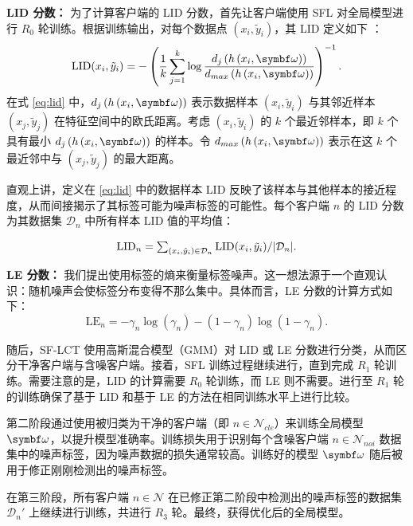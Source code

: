 \textbf{LID 分数：} 为了计算客户端的 LID 分数，首先让客户端使用 SFL 对全局模型进行 $R_0$ 轮训练。根据训练输出，对每个数据点 $(x_i,\tilde{y}_i)$，其 LID 定义如下 \cite{b9,amsaleg2015estimating,houle2013dimensionality}：
\begin{align}\label{eq:lid}
\text{LID}(x_i,\tilde{y}_i)=-\left(\frac{1}{k}\sum_{j=1}^k\log\frac{d_j\left(h\left(x_i,\omegab\right)\right)}{d_{max}\left(h\left(x_i,\omegab\right)\right)}\right)^{-1}.
\end{align}
在式 \eqref{eq:lid} 中，$d_j\left(h\left(x_i,\omegab\right)\right)$ 表示数据样本 $(x_i,\tilde{y}_i)$ 与其邻近样本 $(x_j,\tilde{y}_j)$ 在特征空间中的欧氏距离。考虑 $(x_i,\tilde{y}_i)$ 的 $k$ 个最近邻样本，即 $k$ 个具有最小 $d_j\left(h\left(x_i,\omegab\right)\right)$ 的样本。令 $d_{max}\left(h\left(x_i,\omegab\right)\right)$ 表示在这 $k$ 个最近邻中与 $(x_j,\tilde{y}_j)$ 的最大距离。

直观上讲，定义在 \eqref{eq:lid} 中的数据样本 LID 反映了该样本与其他样本的接近程度，从而间接揭示了其标签可能为噪声标签的可能性。每个客户端 $n$ 的 LID 分数为其数据集 $\mathcal{D}_n$ 中所有样本 LID 值的平均值：

\begin{equation}\label{definition of lid}
\textstyle \text{LID}_n = \sum_{(x_i,\tilde{y}_i)\in\mathcal{D}_{n}} \text{LID}(x_i,\tilde{y}_i)/|\mathcal{D}_n|.
\end{equation}

\textbf{LE 分数：} 我们提出使用标签的熵来衡量标签噪声。这一想法源于一个直观认识：随机噪声会使标签分布变得不那么集中。具体而言，LE 分数的计算方式如下：
\begin{equation}\label{eq:LE}
\text{LE}_n=-\gamma_n\log(\gamma_n)-(1-\gamma_n)\log(1-\gamma_n).
\end{equation}

随后，SF-LCT 使用高斯混合模型（GMM）对 LID 或 LE 分数进行分类，从而区分干净客户端与含噪客户端。接着，SFL 训练过程继续进行，直到完成 $R_1$ 轮训练。需要注意的是，LID 的计算需要 $R_0$ 轮训练，而 LE 则不需要。进行至 $R_1$ 轮的训练确保了基于 LID 和基于 LE 的方法在相同训练水平上进行比较。

第二阶段通过使用被归类为干净的客户端（即 $n \in \mathcal{N}_{cle}$）来训练全局模型 $\omegab$，以提升模型准确率。训练损失用于识别每个含噪客户端 $n\in\mathcal{N}_{noi}$ 数据集中的噪声标签，因为噪声数据的损失通常较高。训练好的模型 $\omegab$ 随后被用于修正刚刚检测出的噪声标签。

在第三阶段，所有客户端 $n \in \mathcal{N}$ 在已修正第二阶段中检测出的噪声标签的数据集 $\mathcal{D}_n'$ 上继续进行训练，共进行 $R_3$ 轮。最终，获得优化后的全局模型。

